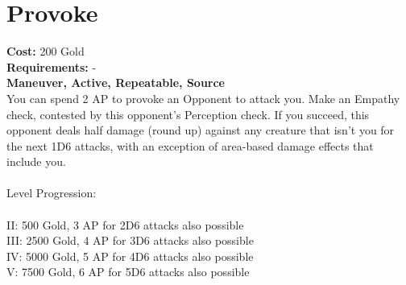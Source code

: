 \section{Provoke}
\textbf{Cost:} 200 Gold\\
\textbf{Requirements:} -\\
\textbf{Maneuver, Active, Repeatable, Source}\\
You can spend 2 AP to provoke an Opponent to attack you. Make an Empathy check, contested by this opponent’s Perception check. If you succeed, this opponent deals half damage (round up) against any creature that isn’t you for the next 1D6 attacks, with an exception of area-based damage effects that include you.\\
\\
Level Progression:\\
\\
II: 500 Gold, 3 AP for 2D6 attacks also possible\\
III: 2500 Gold, 4 AP for 3D6 attacks also possible\\
IV: 5000 Gold, 5 AP for 4D6 attacks also possible\\
V: 7500 Gold, 6 AP for 5D6 attacks also possible\\